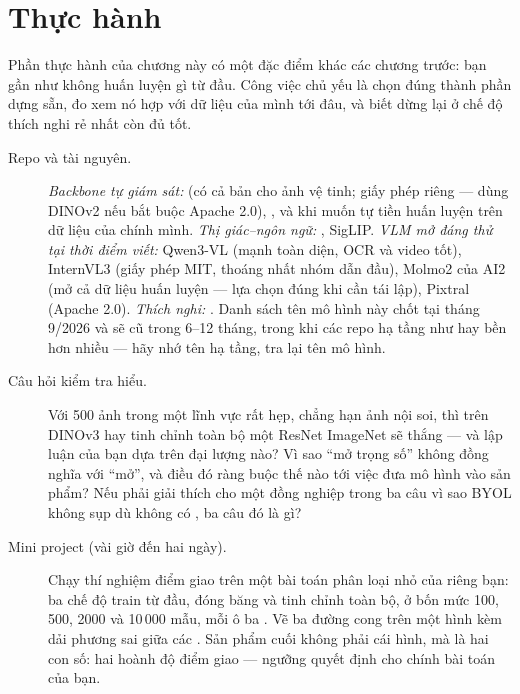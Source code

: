 \documentclass[../../deep_learning.tex]{subfiles}
\begin{document}




\section{Thực hành}
Phần thực hành của chương này có một đặc điểm khác các chương trước: bạn gần như không huấn luyện gì từ đầu. Công việc chủ yếu là chọn đúng thành phần dựng sẵn, đo xem nó hợp với dữ liệu của mình tới đâu, và biết dừng lại ở chế độ thích nghi rẻ nhất còn đủ tốt.

\begin{description}
\item[Repo và tài nguyên.] \emph{Backbone tự giám sát:}  (có cả bản cho ảnh vệ tinh; giấy phép riêng --- dùng DINOv2 nếu bắt buộc Apache 2.0), ,  và  khi muốn tự tiền huấn luyện trên dữ liệu của chính mình. \emph{Thị giác--ngôn ngữ:} , SigLIP. \emph{VLM mở đáng thử tại thời điểm viết:} Qwen3-VL (mạnh toàn diện, OCR và video tốt), InternVL3 (giấy phép MIT, thoáng nhất nhóm dẫn đầu), Molmo2 của AI2 (mở cả dữ liệu huấn luyện --- lựa chọn đúng khi cần tái lập), Pixtral (Apache 2.0). \emph{Thích nghi:} . Danh sách tên mô hình này chốt tại tháng 9/2026 và sẽ cũ trong 6--12 tháng, trong khi các repo hạ tầng như  hay  bền hơn nhiều --- hãy nhớ tên hạ tầng, tra lại tên mô hình.

\item[Câu hỏi kiểm tra hiểu.] Với 500 ảnh trong một lĩnh vực rất hẹp, chẳng hạn ảnh nội soi, thì  trên DINOv3 hay tinh chỉnh toàn bộ một ResNet ImageNet sẽ thắng --- và lập luận của bạn dựa trên đại lượng nào? Vì sao ``mở trọng số'' không đồng nghĩa với ``mở'', và điều đó ràng buộc thế nào tới việc đưa mô hình vào sản phẩm? Nếu phải giải thích cho một đồng nghiệp trong ba câu vì sao BYOL không sụp dù không có , ba câu đó là gì?

\item[Mini project (vài giờ đến hai ngày).] Chạy thí nghiệm điểm giao trên một bài toán phân loại nhỏ của riêng bạn: ba chế độ train từ đầu, đóng băng và tinh chỉnh toàn bộ, ở bốn mức 100, 500, 2000 và 10\,000 mẫu, mỗi ô ba . Vẽ ba đường cong trên một hình kèm dải phương sai giữa các . Sản phẩm cuối không phải cái hình, mà là hai con số: hai hoành độ điểm giao --- ngưỡng quyết định cho chính bài toán của bạn.

\end{description}
\end{document}
